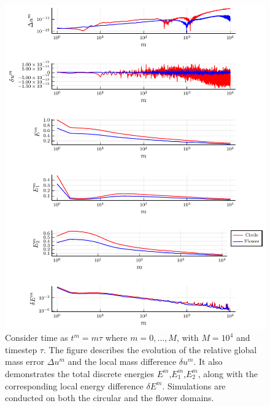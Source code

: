 \documentclass[11pt]{article}
\theoremstyle{remark}
\numberwithin{equation}{section}
\begin{document}
\begin{figure}[]
    \includegraphics{results/physical_CH_plot.pdf}
\caption{Consider time as $t^{m} = m\tau $ where $m= 0,\ldots, M $, with $M = 10^4$ and timestep $\tau $. The figure describes the evolution of the relative global mass error $\Delta u^m$ and the local mass difference $\delta u^m$. It also demonstrates the total discrete energies $E^m$,$E^m_{1}$,$E^m_{2}$, along with the corresponding local energy difference $\delta E^m$. Simulations are conducted on both the circular and the flower domains.}
    \label{fig:physical_CH_plot}
\end{figure}
\end{document}
